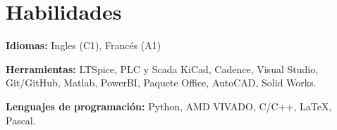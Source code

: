 \section{Habilidades}
 \begin{itemize}[leftmargin=0.15in, label={}]
    \small{\item{
    
    \textbf{Idiomas: }{Ingles (C1), Francés (A1)} \\
    \medskip
    
    \textbf{Herramientas: }{LTSpice, PLC y Scada KiCad, Cadence, Visual Studio, Git/GitHub, Matlab, PowerBI, Paquete Office, AutoCAD, Solid Works.}\\
    \medskip 

    \textbf{Lenguajes de programación: }{Python, AMD VIVADO, C/C++, \LaTeX, Pascal.} \\
    \medskip
     
     

     }
     }
 \end{itemize}